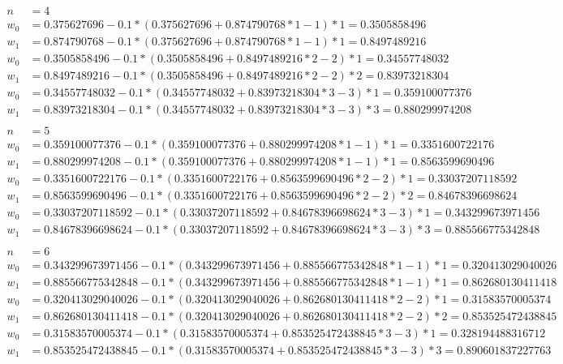 \documentclass{report}
\begin{document}
\begin{equation} \label{eq1}
\begin{split}
n & = 4 \\
w_0 & = 0.375627696 - 0.1 * (0.375627696+0.874790768*1-1) * 1 = 0.3505858496\\
w_1 & = 0.874790768 - 0.1 * (0.375627696+0.874790768*1-1) * 1 = 0.8497489216\\
w_0 & = 0.3505858496 - 0.1 * (0.3505858496+0.8497489216*2-2) * 1 = 0.34557748032\\
w_1 & = 0.8497489216 - 0.1 * (0.3505858496+0.8497489216*2-2) * 2 = 0.83973218304\\
w_0 & = 0.34557748032 - 0.1 * (0.34557748032+0.83973218304*3-3) * 1 = 0.359100077376\\
w_1 & = 0.83973218304 - 0.1 * (0.34557748032+0.83973218304*3-3) * 3 = 0.880299974208\\
\end{split}
\end{equation}
\begin{equation} \label{eq1}
\begin{split}
  n & = 5 \\
w_0 & = 0.359100077376 - 0.1 * (0.359100077376+0.880299974208*1-1) * 1 = 0.3351600722176\\
w_1 & = 0.880299974208 - 0.1 * (0.359100077376+0.880299974208*1-1) * 1 = 0.8563599690496\\
w_0 & = 0.3351600722176 - 0.1 * (0.3351600722176+0.8563599690496*2-2) * 1 = 0.33037207118592\\
w_1 & = 0.8563599690496 - 0.1 * (0.3351600722176+0.8563599690496*2-2) * 2 = 0.84678396698624\\
w_0 & = 0.33037207118592 - 0.1 * (0.33037207118592+0.84678396698624*3-3) * 1 = 0.343299673971456\\
w_1 & = 0.84678396698624 - 0.1 * (0.33037207118592+0.84678396698624*3-3) * 3 = 0.885566775342848\\
\end{split}
\end{equation}
\begin{equation} \label{eq1}
\begin{split}
  n & = 6 \\
w_0 & = 0.343299673971456 - 0.1 * (0.343299673971456+0.885566775342848*1-1) * 1 = 0.320413029040026\\
w_1 & = 0.885566775342848 - 0.1 * (0.343299673971456+0.885566775342848*1-1) * 1 = 0.862680130411418\\
w_0 & = 0.320413029040026 - 0.1 * (0.320413029040026+0.862680130411418*2-2) * 1 = 0.31583570005374\\
w_1 & = 0.862680130411418 - 0.1 * (0.320413029040026+0.862680130411418*2-2) * 2 = 0.853525472438845\\
w_0 & = 0.31583570005374 - 0.1 * (0.31583570005374+0.853525472438845*3-3) * 1 = 0.328194488316712\\
w_1 & = 0.853525472438845 - 0.1 * (0.31583570005374+0.853525472438845*3-3) * 3 = 0.890601837227763\\
\end{split}
\end{equation}
\end{document}
